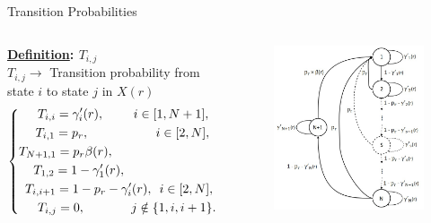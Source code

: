 \documentclass[
	xcolor={svgnames},
	hyperref={pagebackref,bookmarks},
	aspectratio=43,
]{beamer}
\begin{document}
\begin{frame}{Transition Probabilities}
    \begin{columns}
        \textbf{\underline{Definition}: \boldmath$T_{i, j}$} \\ \vspace*{1mm}
            $T_{i, j} \rightarrow$ Transition probability from state $i$ to state $j$ in $X(r)$
            \begin{equation}
                \begin{dcases*}
                    \quad\,\,\, T_{i, i} = \gamma_i'(r), \qquad\,\, i \in \lbrack 1, N+1 \rbrack, \\
                    \quad\,\, T_{i, 1} = p_r, \quad\qquad\qquad\,\, i \in \lbrack 2, N \rbrack, \\
                    T_{N+1, 1} = p_r \beta(r), \\
                    \quad\, T_{1, 2} = 1 - \gamma_1'(r), \\
                    \,\,\,T_{i, i+1} = 1 - p_r - \gamma_i'(r), \,\,\, i \in \lbrack 2, N \rbrack, \\
                    \quad\ \, T_{i, j} = 0, \qquad\quad\,\,\ j \notin \lbrace 1, i, i+1 \rbrace.
                \end{dcases*}
            \end{equation}
        \begin{figure}
            \centering
            \includegraphics[scale=0.25]{macs.jpeg}
        \end{figure}
    \end{columns}
\end{frame}
\end{document}

